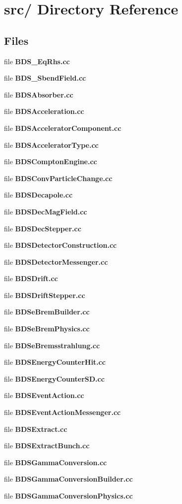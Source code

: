 \section{src/ Directory Reference}
\label{dir_000006}
\subsection*{Files}
\begin{CompactItemize}
\item 
file {\bf BDS_EqRhs.cc}
\item 
file {\bf BDS_SbendField.cc}
\item 
file {\bf BDSAbsorber.cc}
\item 
file {\bf BDSAcceleration.cc}
\item 
file {\bf BDSAcceleratorComponent.cc}
\item 
file {\bf BDSAcceleratorType.cc}
\item 
file {\bf BDSComptonEngine.cc}
\item 
file {\bf BDSConvParticleChange.cc}
\item 
file {\bf BDSDecapole.cc}
\item 
file {\bf BDSDecMagField.cc}
\item 
file {\bf BDSDecStepper.cc}
\item 
file {\bf BDSDetectorConstruction.cc}
\item 
file {\bf BDSDetectorMessenger.cc}
\item 
file {\bf BDSDrift.cc}
\item 
file {\bf BDSDriftStepper.cc}
\item 
file {\bf BDSeBremBuilder.cc}
\item 
file {\bf BDSeBremPhysics.cc}
\item 
file {\bf BDSeBremsstrahlung.cc}
\item 
file {\bf BDSEnergyCounterHit.cc}
\item 
file {\bf BDSEnergyCounterSD.cc}
\item 
file {\bf BDSEventAction.cc}
\item 
file {\bf BDSEventActionMessenger.cc}
\item 
file {\bf BDSExtract.cc}
\item 
file {\bf BDSExtractBunch.cc}
\item 
file {\bf BDSGammaConversion.cc}
\item 
file {\bf BDSGammaConversionBuilder.cc}
\item 
file {\bf BDSGammaConversionPhysics.cc}

\end{CompactItemize}
